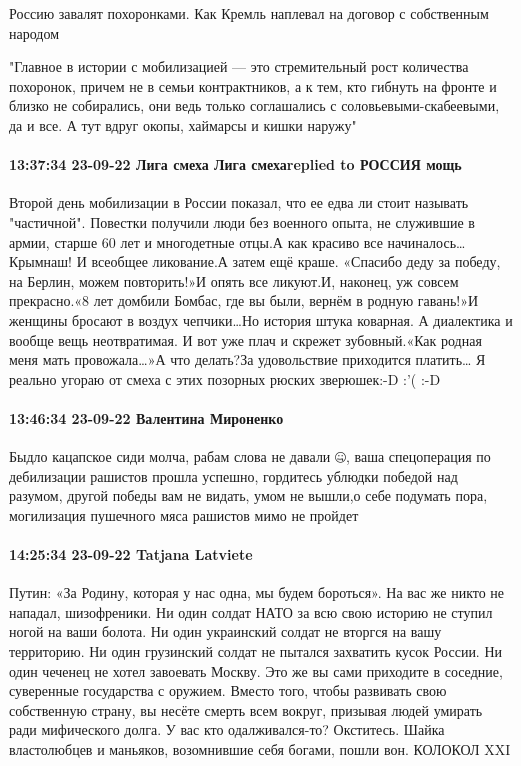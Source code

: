 Россию завалят похоронками. Как Кремль наплевал на договор с собственным народом

"Главное в истории с мобилизацией — это стремительный рост количества
похоронок, причем не в семьи контрактников, а к тем, кто гибнуть на фронте и
близко не собирались, они ведь только соглашались с соловьевыми-скабеевыми, да
и все. А тут вдруг окопы, хаймарсы и кишки наружу"


\paragraph{13:37:34 23-09-22 Лига смеха Лига смехаreplied to РОССИЯ мощь}

Второй день мобилизации в России показал, что ее едва ли стоит называть
"частичной". Повестки получили люди без военного опыта, не служившие в армии,
старше 60 лет и многодетные отцы.А как красиво все начиналось…Крымнаш! И
всеобщее ликование.А затем ещё краше. «Спасибо деду за победу, на Берлин, можем
повторить!»И опять все ликуют.И, наконец, уж совсем прекрасно.«8 лет домбили
Бомбас, где вы были, вернём в родную гавань!»И женщины бросают в воздух
чепчики…Но история штука коварная. А диалектика и вообще вещь неотвратимая. И
вот уже плач и скрежет зубовный.«Как родная меня мать провожала…»А что
делать?За удовольствие приходится платить… Я реально угораю от смеха с этих
позорных рюских зверюшек:-D :'( :-D

\paragraph{13:46:34 23-09-22 Валентина Мироненко}

Быдло кацапское сиди молча, рабам слова не давали 🤐, ваша спецоперация по
дебилизации рашистов прошла успешно, гордитесь ублюдки победой над разумом,
другой победы вам не видать, умом не вышли,о себе подумать пора, могилизация
пушечного мяса рашистов мимо не пройдет 🤪🤣🤣🤣

\paragraph{14:25:34 23-09-22 Tatjana Latviete}

Путин: «За Родину, которая у нас одна, мы будем бороться».
На вас же никто не нападал, шизофреники.
Ни один солдат НАТО за всю свою историю не ступил ногой на ваши болота.
Ни один украинский солдат не вторгся на вашу территорию.
Ни один грузинский солдат не пытался захватить кусок России.
Ни один чеченец не хотел завоевать Москву.
Это же вы сами приходите в соседние, суверенные государства с оружием.
Вместо того, чтобы развивать свою собственную страну, вы несёте смерть всем вокруг, призывая людей умирать ради мифического долга.
У вас кто одалживался-то? Окститесь.
Шайка властолюбцев и маньяков, возомнившие себя богами, пошли вон.
КОЛОКОЛ XXI


